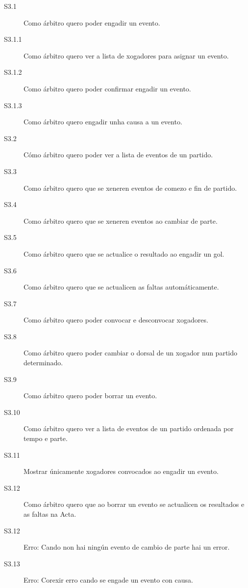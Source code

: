        \begin{description}
          \item [S3.1] Como árbitro quero poder engadir un evento.
          \item [S3.1.1] Como árbitro quero ver a lista de xogadores para 
asignar un evento.
          \item [S3.1.2] Como árbitro quero poder confirmar engadir un evento.
          \item [S3.1.3] Como árbitro quero engadir unha causa a un evento.
          \item [S3.2] Cómo árbitro quero poder ver a lista de eventos de un 
partido.
          \item [S3.3] Como árbitro quero que se xeneren eventos de comezo e 
fin de partido.
          \item [S3.4] Como árbitro quero que se xeneren eventos ao cambiar de 
parte.
          \item [S3.5] Como árbitro quero que se actualice o resultado ao 
engadir un gol.
          \item [S3.6] Como árbitro quero que se actualicen as faltas 
automáticamente.
          \item [S3.7] Como árbitro quero poder convocar e desconvocar 
xogadores.
          \item [S3.8] Como árbitro quero poder cambiar o dorsal de un xogador 
nun partido determinado.
          \item [S3.9] Como árbitro quero poder borrar un evento.
          \item [S3.10] Como árbitro quero ver a lista de eventos de un partido 
ordenada por tempo e parte.
          \item [S3.11] Mostrar únicamente xogadores convocados ao engadir un 
evento.
          \item [S3.12] Como árbitro quero que ao borrar un evento se 
actualicen os 
resultados e as faltas na Acta.
          \item [S3.12] Erro: Cando non hai ningún evento de cambio de parte 
hai un error.
          \item [S3.13] Erro: Corexir erro cando se engade un evento con causa.
        \end{description}

